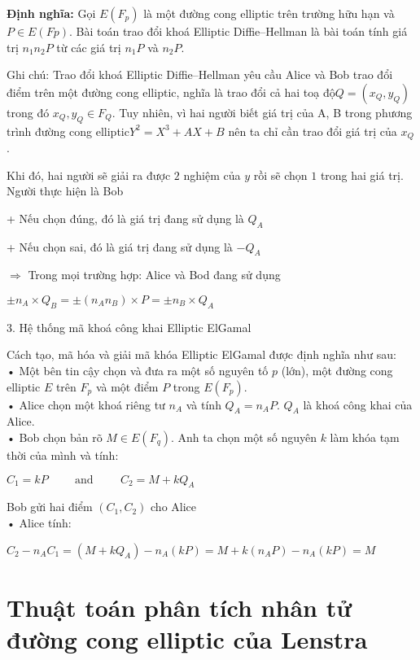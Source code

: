 \documentclass[13pt,a4paper,oneside,openany]{book}
\theoremstyle{definition}
\begin{document}
\textbf{Định nghĩa:} Gọi $ E(F_p) $ là một đường cong elliptic trên trường hữu hạn và $  P \in
	E(Fp) $. Bài toán trao đổi khoá Elliptic Diffie–Hellman là bài toán tính giá trị $ n_1n_2P $
từ các giá trị $ n_1P $ và $ n_2P $.

Ghi chú: Trao đổi khoá Elliptic Diffie–Hellman yêu cầu Alice và Bob trao
đổi điểm trên một đường cong elliptic, nghĩa là trao đổi cả hai toạ độ$  Q = (x_Q, y_Q) $
trong đó $ x_Q, y_Q \in F_Q$. Tuy nhiên, vì hai người biết giá trị của A, B trong phương
trình đường cong elliptic$  Y^2 = X^3 + AX + B $ nên ta chỉ cần trao đổi giá trị của $ x_Q $.

Khi đó, hai người sẽ giải ra được $ 2 $ nghiệm của $ y $ rồi sẽ chọn $ 1 $ trong hai giá
trị. Người thực hiện là Bob

+ Nếu chọn đúng, đó là giá trị đang sử dụng là $ Q_A $

+ Nếu chọn sai, đó là giá trị đang sử dụng là $ -Q_A $

$ \Longrightarrow $ Trong mọi trường hợp: Alice và Bod đang sử dụng
\begin{center}
	$ \pm n_A \times Q_B = \pm (n_A n_B) \times P = \pm n_B × Q_A $
\end{center}
3. Hệ thống mã khoá công khai Elliptic ElGamal

Cách tạo, mã hóa và giải mã khóa Elliptic ElGamal được định nghĩa như
sau:\\
• Một bên tin cậy chọn và đưa ra một số nguyên tố $ p $ (lớn),
một đường cong elliptic $ E $ trên $ F_p $ và một điểm $ P $ trong $ E (F_p) $.\\
• Alice chọn một khoá riêng tư $ n_A $ và tính $ Q_A = n_AP $. $ Q_A $ là khoá công
khai của Alice.\\
• Bob chọn bản rõ $ M \in E(F_q) $. Anh ta chọn một số nguyên $ k $ làm
khóa tạm thời của mình và tính:
\begin{center}
	$ C_1 = kP \hspace{1cm} \text{and} \hspace{1cm} C_2 = M + kQ_A $
\end{center}
Bob gửi hai điểm $ (C_1, C_2) $ cho Alice\\
• Alice tính:
\begin{center}
	$ 	C_2 - n_A C_1 = (M + kQ_A) - n_A(kP) = M + k(n_AP) - n_A(kP) = M $
\end{center}
\section{ Thuật toán phân tích nhân tử đường cong elliptic của Lenstra}
\end{document}

